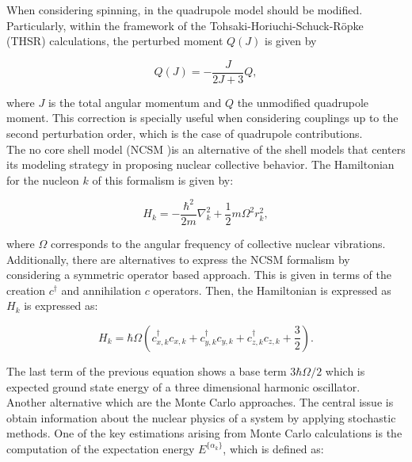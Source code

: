 \documentclass[openany]{book}
\begin{document}
When considering spinning, in the quadrupole model should be modified. Particularly, within the framework of the Tohsaki-Horiuchi-Schuck-Röpke (THSR) calculations, the perturbed moment $Q(J)$ is given by

\begin{equation}\label{eq:micro_quadrupole_J}
	Q(J) = - \frac{J}{2J + 3} Q,
\end{equation}

where $J$ is the total angular momentum and $Q$ the unmodified quadrupole moment. This correction is specially useful when considering couplings up to the second perturbation order, which is the case of quadrupole contributions. \\

The no core shell model (NCSM )is an alternative of the shell models that centers its modeling strategy in proposing nuclear collective behavior. The Hamiltonian for the nucleon $k$ of this formalism is given by: 

\begin{equation}\label{eq:micro_NCSM_Hamiltonian}
	H_k = -\frac{\hbar^2}{2m} \nabla^2_k + \frac{1}{2} m \Omega^2 r^2_k,
\end{equation}

where $\Omega$ corresponds to the angular frequency of collective nuclear vibrations. \\

Additionally, there are alternatives to express the NCSM formalism by considering a symmetric operator based approach. This is given in terms of the creation $c^{\dagger}$ and annihilation $c$ operators. Then, the Hamiltonian is expressed as $H_k$ is expressed as: 

\begin{equation}\label{eq:micro_NCSM_symmetric_Hamiltonian}
	H_k = \hbar \Omega \left (c^{\dagger}_{x, k} c_{x, k} + c^{\dagger}_{y, k} c_{y, k} +  c^{\dagger}_{z, k} c_{z, k} +  \frac{3}{2}  \right).
\end{equation}

The last term of the previous equation shows a base term  $3\hbar\Omega/2$ which is expected ground state energy of a three dimensional harmonic oscillator. \\

Another alternative which are the Monte Carlo approaches. The central issue is obtain information about the nuclear physics of a system by applying stochastic methods. One of the key estimations arising from Monte Carlo calculations is the computation of the expectation energy $E^{\{\alpha_k\}}$, which is defined as: 
	
\end{document}
